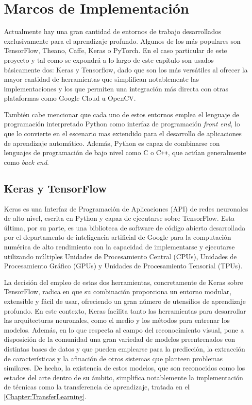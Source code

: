 \renewcommand{\tablename}{Tabla}
\chapter{Marcos de Implementación} \label{Chapter:3}

Actualmente hay una gran cantidad de entornos de trabajo desarrollados exclusivamente para el aprendizaje profundo. Algunos de los más populares son TensorFlow, Theano, Caffe, Keras o PyTorch. En el caso particular de este proyecto y tal como se expondrá a lo largo de este capítulo son usados básicamente dos: Keras y Tensorflow, dado que son los más versátiles al ofrecer la mayor cantidad de herramientas que simplifican notablemente las implementaciones y los que permiten una integración más directa con otras plataformas como Google Cloud u OpenCV.

También cabe mencionar que cada uno de estos entornos emplea el lenguaje de programación interpretado Python como interfaz de programación \textit{front end}, lo que lo convierte en el escenario mas extendido para el desarrollo de aplicaciones de aprendizaje automático. Además, Python es capaz de combinarse con lenguajes de programación de bajo nivel como C o C\texttt{++}, que actúan generalmente como \textit{back end}.

\section{Keras y TensorFlow}

Keras es una Interfaz de Programación de Aplicaciones (API) de redes neuronales de alto nivel, escrita en Python y capaz de ejecutarse sobre TensorFlow. Esta última, por su parte, es una biblioteca de software de código abierto desarrollada por el departamento de inteligencia artificial de Google para la computación numérica de alto rendimiento con la capacidad de implementarse y ejecutarse utilizando múltiples Unidades de Procesamiento Central (CPUs), Unidades de Procesamiento Gráfico (GPUs) y Unidades de Procesamiento Tensorial (TPUs).

La decisión del empleo de estas dos herramientas, concretamente de Keras sobre TensorFlow, radica en que su combinación proporciona un entorno modular, extensible y fácil de usar, ofreciendo un gran número de utensilios de aprendizaje profundo. En este contexto, Keras facilita tanto las herramientas para desarrollar las arquitecturas neuronales, como el medio y los métodos para entrenar los modelos. Además, en lo que respecta al campo del reconocimiento visual, pone a disposición de la comunidad una gran variedad de modelos preentrenados con distintas bases de datos y que pueden emplearse para la predicción, la extracción de características y la afinación de otros sistemas que planteen problemas similares. De hecho, la existencia de estos modelos, que son reconocidos como los estados del arte dentro de su ámbito, simplifica notablemente la implementación de técnicas como la transferencia de aprendizaje, tratada en el \autoref{Chapter:TransferLearning}.

